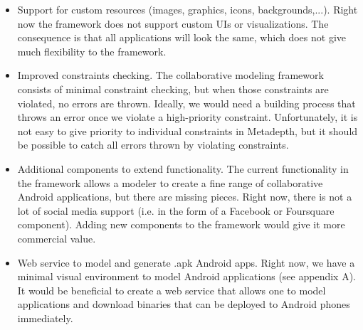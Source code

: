 \begin{itemize}
\item{Support for custom resources (images, graphics, icons, backgrounds,...). Right now the framework does not support custom UIs or visualizations. The consequence is that all applications will look the same, which does not give much flexibility to the framework.}
\item{Improved constraints checking. The collaborative modeling framework consists of minimal constraint checking, but when those constraints are violated, no errors are thrown. Ideally, we would need a building process that throws an error once we violate a high-priority constraint. Unfortunately, it is not easy to give priority to individual constraints in Metadepth, but it should be possible to catch all errors thrown by violating constraints.}
\item{Additional components to extend functionality. The current functionality in the framework allows a modeler to create a fine range of collaborative Android applications, but there are missing pieces. Right now, there is not a lot of social media support (i.e. in the form of a Facebook or Foursquare component). Adding new components to the framework would give it more commercial value.}
\item{Web service to model and generate .apk Android apps. Right now, we have a minimal visual environment to model Android applications (see appendix A). It would be beneficial to create a web service that allows one to model applications and download binaries that can be deployed to Android phones immediately.}
\end{itemize}
